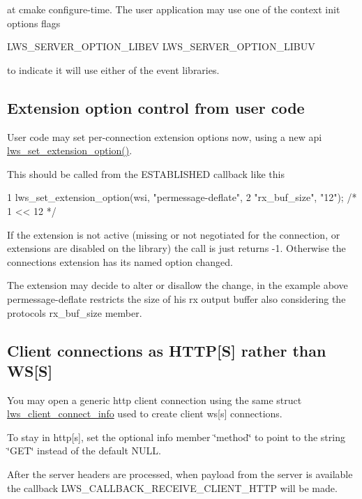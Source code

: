 at cmake configure-\/time. The user application may use one of the context init options flags \begin{DoxyVerb}    LWS_SERVER_OPTION_LIBEV
    LWS_SERVER_OPTION_LIBUV
\end{DoxyVerb}


to indicate it will use either of the event libraries.

\subsection*{Extension option control from user code }

User code may set per-\/connection extension options now, using a new api {\ttfamily \hyperlink{group__extensions_gae0e24e1768f83a7fb07896ce975704b9}{lws\+\_\+set\+\_\+extension\+\_\+option()}}.

This should be called from the E\+S\+T\+A\+B\+L\+I\+S\+H\+ED callback like this 
\begin{DoxyCode}
1 lws\_set\_extension\_option(wsi, "permessage-deflate",
2                          "rx\_buf\_size", "12"); /* 1 << 12 */
\end{DoxyCode}


If the extension is not active (missing or not negotiated for the connection, or extensions are disabled on the library) the call is just returns -\/1. Otherwise the connection\textquotesingle{}s extension has its named option changed.

The extension may decide to alter or disallow the change, in the example above permessage-\/deflate restricts the size of his rx output buffer also considering the protocol\textquotesingle{}s rx\+\_\+buf\+\_\+size member.

\subsection*{Client connections as H\+T\+TP\mbox{[}S\mbox{]} rather than WS\mbox{[}S\mbox{]} }

You may open a generic http client connection using the same struct \hyperlink{structlws__client__connect__info}{lws\+\_\+client\+\_\+connect\+\_\+info} used to create client ws\mbox{[}s\mbox{]} connections.

To stay in http\mbox{[}s\mbox{]}, set the optional info member \char`\"{}method\char`\"{} to point to the string \char`\"{}\+G\+E\+T\char`\"{} instead of the default N\+U\+LL.

After the server headers are processed, when payload from the server is available the callback L\+W\+S\+\_\+\+C\+A\+L\+L\+B\+A\+C\+K\+\_\+\+R\+E\+C\+E\+I\+V\+E\+\_\+\+C\+L\+I\+E\+N\+T\+\_\+\+H\+T\+TP will be made.

